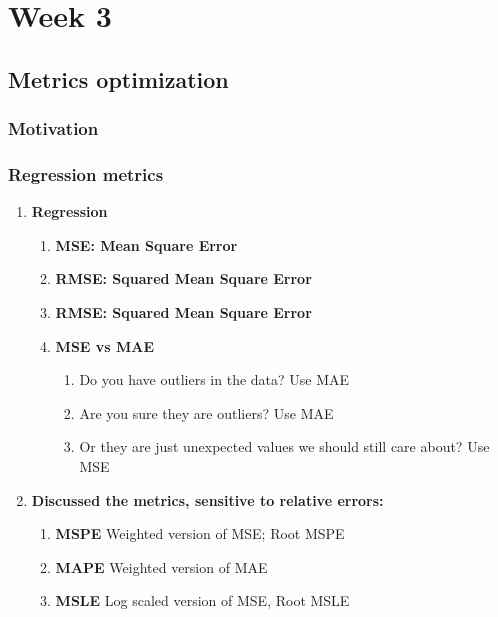 \documentclass[11pt, twoside]{article}   	%
\begin{document}
\pagebreak
\section{Week 3}
\subsection{Metrics optimization}
\subsubsection{Motivation}
\subsubsection{Regression metrics}
\renewcommand{\labelenumii}{\alph{enumii}}
\begin{enumerate}
\item \textbf{Regression}
\begin{enumerate}
  \item \textbf{MSE: Mean Square Error}
  \item \textbf{RMSE: Squared Mean Square Error}
  \item \textbf{RMSE: Squared Mean Square Error}
  \item \textbf{MSE vs MAE}
    \begin{enumerate}
      \item  Do you have outliers in the data?  Use MAE
      \item  Are you sure they are outliers? Use MAE
      \item   Or they are just unexpected values we should still care about? Use MSE
    \end{enumerate}
      \end{enumerate}
      \item \textbf{Discussed the metrics, sensitive to relative errors:}
      \begin{enumerate}
  \item \textbf{MSPE} Weighted version of MSE; Root MSPE
  \item \textbf{MAPE} Weighted version of MAE
  \item \textbf{MSLE} Log scaled version of MSE, Root MSLE
     \end{enumerate} 
    
       
 \end{enumerate}
\end{document}
